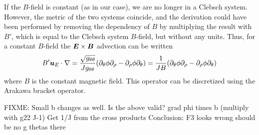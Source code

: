 If the $B$-field is constant (as in our case), we are no longer in a Clebsch system.
However, the metric of the two systems coincide, and the derivation could have been performed by removing the dependency of $B$ by multiplying the result with $B'$, which is equal to the Clebsch system $B$-field, but without any units.
 Thus, for a constant $B$-field the $\boldsymbol{E}\times\boldsymbol{B}$ advection can be written
%
\begin{align}
    B'\boldsymbol{u}_E\cdot\nabla
    = \frac{\sqrt{g_{\theta\theta}}}{J g_{\theta\theta}}
    (\partial_\theta\phi\partial_\rho - \partial_\rho\phi\partial_\theta)
    = \frac{1}{JB}
    (\partial_\theta\phi\partial_\rho - \partial_\rho\phi\partial_\theta)
    \label{poi:def}
\end{align}
%
where $B$ is the constant magnetic field.
This operator can be discretized using the Arakawa bracket operator.

FIXME: Small b changes as well. Is the above valid?
grad phi times b (multiply with g22 J-1)
Get 1/J from the cross products
Conclusion: F3 looks wrong
should be no g thetas there
